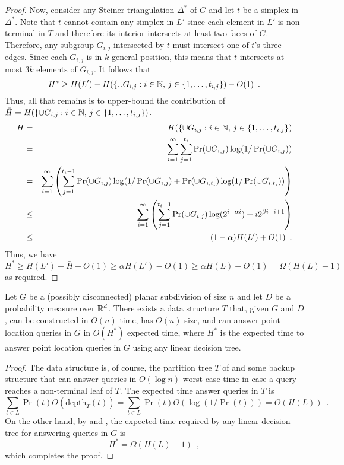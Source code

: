 \documentclass{patmorin}
\newcommand{\depth}{\mathrm{depth}}
\begin{document}
\begin{proof}
  Now, consider any Steiner triangulation $\Delta^*$ of $G$ and let
  $t$ be a simplex in $\Delta^*$.  Note that $t$ cannot contain any
  simplex in $L'$ since each element in $L'$ is non-terminal in $T$
  and therefore its interior intersects at least two faces of $G$.
  Therefore, any subgroup $G_{i,j}$ intersected by $t$ must intersect one
  of $t$'s three edges. Since each $G_{i,j}$ is in $k$-general position,
  this means that $t$ intersects at most $3k$ elements of $G_{i,j}$.
  It follows \cite[Lemma~3]{cdilm09} that
  \[
    H^* \ge H(L') 
       - H(\{\cup G_{i,j}:i\in\mathbb{N},\, j \in\{1,\ldots,t_{i,j}\}) 
       - O(1) \enspace .
  \]
  Thus, all that remains is to upper-bound the contribution of $\bar{H}=H(\{\cup G_{i,j}:i\in\mathbb{N},\, j \in\{1,\ldots,t_{i,j}\})$.
  \begin{eqnarray*}
    \bar{H} &= & H(\{\cup G_{i,j}:i\in\mathbb{N},\, j \in\{1,\ldots,t_{i,j}\}) \\
     & = & \sum_{i=1}^\infty \sum_{j=1}^{t_{i}} 
         \Pr(\cup G_{i,j})\log(1/\Pr(\cup G_{i,j})) \\
   & = & \sum_{i=1}^\infty
        \left( 
          \sum_{j=1}^{t_{i}-1} 
             \Pr(\cup G_{i,j})\log(1/\Pr(\cup G_{i,j}) 
             + \Pr(\cup G_{i,t_i})\log(1/\Pr(\cup G_{i,t_i}))
        \right) \\
   & \le & \sum_{i=1}^\infty
        \left( 
          \sum_{j=1}^{t_{i}-1} 
             \Pr(\cup G_{i,j})\log(2^{i-\alpha i})
             + i 2^{\beta i - i + 1}
        \right) \\
    & \le & (1-\alpha)H(L') + O(1) \enspace .
  \end{eqnarray*}
  Thus, we have 
  \[  
     H^* \ge H(L') - \bar{H} -O(1) \ge \alpha H(L') - O(1) 
         \ge \alpha H(L) - O(1) = \Omega(H(L) - 1) 
  \]
  as required.
\end{proof}

\begin{thm}
  Let $G$ be a (possibly disconnected) planar subdivision of size $n$
  and let $D$ be a probability measure over $\mathbb{R}^d$.  There exists a data
  structure $T$ that, given $G$ and $D$, can be constructed in $O(n)$
  time, has $O(n)$ size, and can answer point location queries in $G$
  in $O(H^*)$ expected time, where $H^*$ is the expected time to answer
  point location queries in $G$ using any linear decision tree.
\end{thm}

\begin{proof}
  The data structure is, of course, the partition tree $T$ of
   and some backup structure that can answer
  queries in $O(\log n)$ worst case time in case a query reaches a
  non-terminal leaf of $T$.  The expected time answer queries in $T$ is
  \[
     \sum_{t\in L} \Pr(t)O(\depth_T(t)) = \sum_{t\in L}\Pr(t)O(\log(1/\Pr(t))) = O(H(L)) \enspace .
  \]
  On the other hand, by  and ,
  the expected time required by any linear decision tree for answering
  queries in $G$ is
  \[
      H^* = \Omega(H(L) - 1) \enspace ,
  \]
  which completes the proof.
\end{proof}
\end{document}
